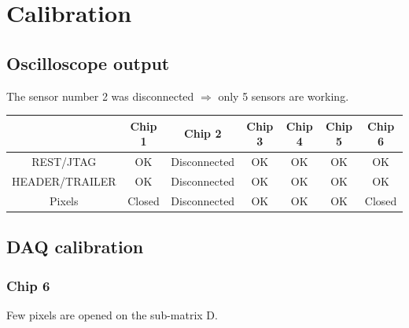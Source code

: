 \documentclass[a4papper, 10pt]{article}
\begin{document}
  \section{Calibration}
  
  \subsection{Oscilloscope output}
  
  The sensor number 2 was disconnected $\Rightarrow$ only 5 sensors are working.
  
  \begin{center}
    \begin{tabular}{c c c c c c c}
      \hline %
        & Chip 1 & Chip 2 & Chip 3 & Chip 4 & Chip 5 & Chip 6 \tabularnewline 
      \hline %
      \hline %
      REST/JTAG & OK & \cellcolor{red}Disconnected & OK & OK & OK & OK  \tabularnewline
      HEADER/TRAILER & OK & \cellcolor{red}Disconnected & OK & OK & OK & OK \tabularnewline
      Pixels & Closed & \cellcolor{red}Disconnected & OK & OK & OK & Closed \tabularnewline
      \hline %
    \end{tabular}
  \end{center}
  
  \subsection{DAQ calibration}
  
    \subsubsection{Chip 6}
  
    Few pixels are opened on the sub-matrix D.
  
\end{document}
